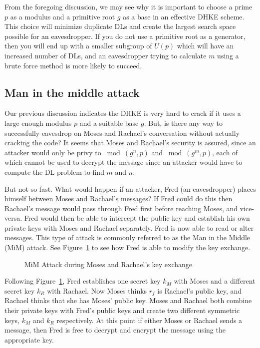 From the foregoing discussion, we may see why it is important to choose a prime $p$ as a modulus and a primitive root $g$ as a base in an effective DHKE scheme. This choice will minimize duplicate DLs and create the largest search space possible for an eavesdropper.  If you do not use a primitive root as a generator, then you will end up with a smaller subgroup of $U(p)$ which will have an increased number of DLs, and an eavesdropper trying to calculate $m$ using a brute force method is more likely to succeed. 

\subsection{Man in the middle attack}
Our previous discussion indicates the DHKE is very hard to crack if it uses a large enough modulus $p$ and a suitable base $g$. But, is there any way to successfully eavesdrop on Moses and Rachael's conversation without actually cracking the code?  It seems that Moses and Rachael's security is assured, since an attacker would only be privy to $\bmod (g^n , p)$ and $\bmod (g^m , p)$, each of which cannot be used to decrypt the message since an attacker would have to compute the DL problem to find $m$ and $n$. 

But not so fast. What would happen if an attacker, Fred (an eavesdropper) places himself between Moses and Rachael's messages?  If Fred could do this then Rachael's message would pass through Fred first before reaching Moses, and vice-versa.  Fred would then be able to intercept the public key and establish his own private keys with Moses and Rachael separately.  Fred is now able to read or alter messages.  This type of attack is commonly referred to as the Man in the Middle (MiM) attack.  See Figure~\ref{fig:DH:DHKE_2} to see how Fred is able to modify the key exchange.
\begin{figure}[htbp]
	  \caption{\label{fig:DH:DHKE_2} MiM Attack during Moses and Rachael's key exchange }
\end{figure}

Following Figure~\ref{fig:DH:DHKE_2}, Fred establishes one secret key $k_M$ with Moses and a different secret key $k_R$ with Rachael.  Now Moses thinks $r_f$ is Rachael's public key, and Rachael thinks that she has Moses' public key. Moses and Rachael both combine their private keys with Fred's public keys and create two different symmetric keys, $k_M$ and $k_R$ respectively. At this point if either Moses or Rachael sends a message, then Fred is free to decrypt and encrypt the message using the appropriate key. 

